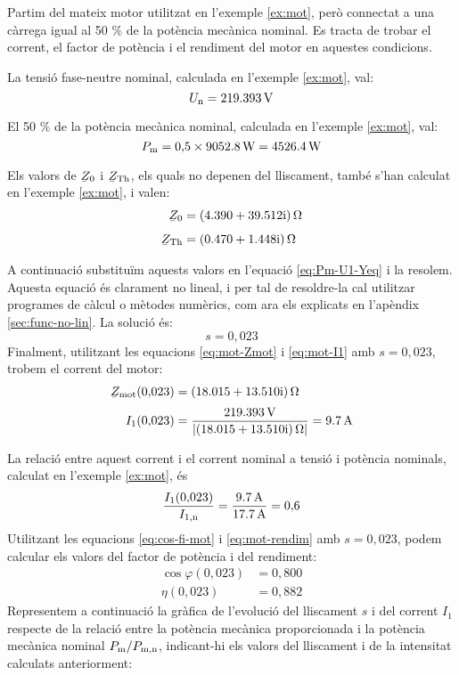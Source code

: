 \begin{exemple}
	Partim del mateix motor utilitzat en l'exemple \vref{ex:mot}, però connectat a una càrrega igual  al 50 \% de la potència mecànica nominal. Es tracta de trobar el corrent, el factor de potència i el rendiment del motor en aquestes condicions.

	La tensió  fase-neutre  nominal, calculada  en l'exemple \ref{ex:mot}, val: 
	\[
		U_\mathrm{n} = \qty{219,393}{V}
	\]
	
	El 50 \% de la potència mecànica nominal, calculada  en l'exemple \ref{ex:mot}, val:
	\[
		P_\mathrm{m} =  0{,}5\times\qty{9052,8}{W} = \qty{4526,4}{W}
	\]

	Els valors de $\cmplx{Z}_0$ i  $\cmplx{Z}\ped{Th}$, els quals no depenen del lliscament, també s'han calculat en  l'exemple \ref{ex:mot}, i valen:
	\begin{align*}
		\cmplx{Z}_0 &=  \complexqty{4,390+j39,512}{\ohm} \\[1ex]
		\cmplx{Z}\ped{Th} &= \complexqty{0,470+j1,448}{\ohm} 
	\end{align*}
	
	A continuació  substituïm aquests valors en l'equació \eqref{eq:Pm-U1-Yeq} i la resolem.  Aquesta equació és clarament no lineal, i per tal de resoldre-la cal utilitzar programes de càlcul o mètodes numèrics, com ara els explicats en l'apèndix \ref{sec:func-no-lin}. La solució és:
	\[
		s = 0{,}023
	\]
	Finalment, utilitzant les equacions \eqref{eq:mot-Zmot} i \eqref{eq:mot-I1} amb $s  = 0{,}023$,  trobem el corrent del motor:
	\begin{align*}
	\cmplx{Z}\ped{mot}(0{,}023) &=  \complexqty{18,015+j13,510}{\ohm} \\[0.5ex]
	I_1(0{,}023) &= \frac{\qty{219,393}{V}}{|\complexqty{18,015+j13,510}{\ohm}|} = \qty{9,7}{A}
	\end{align*}
	
	La relació entre aquest  corrent i el corrent nominal a tensió i potència nominals, calculat en l'exemple \ref{ex:mot}, és
	\[
	\frac{I_1(0{,}023)}{I_\mathrm{1,n}} = \frac{\qty{9,7}{A}}{\qty{17,7}{A}} = 0{,}6
	\]
	Utilitzant les equacions  \eqref{eq:cos-fi-mot} i \eqref{eq:mot-rendim} amb $s  = 0{,}023$, podem calcular els valors del factor de potència i del rendiment:
	\begin{align*}
		\cos\varphi(0{,}023) &=  0{,}800 \\
		\eta(0{,}023) &=  0{,}882
	\end{align*}	
	Representem a continuació la gràfica de l'evolució del lliscament $s$ i del corrent $I_1$ respecte de la relació entre la potència mecànica proporcionada i la potència mecànica nominal $P_\mathrm{m}/P_\mathrm{m,n}$, indicant-hi els valors del lliscament i de la intensitat calculats anteriorment:
	\begin{center}
		
	\end{center}


\end{exemple}
